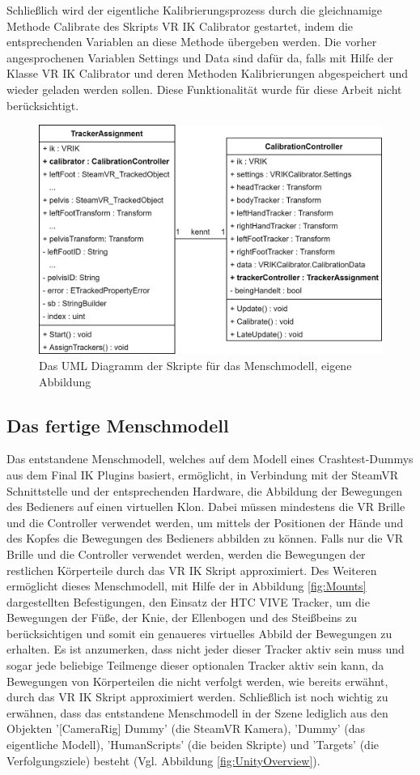 Schließlich wird der eigentliche Kalibrierungsprozess durch die gleichnamige Methode Calibrate des Skripts VR IK Calibrator gestartet, indem die entsprechenden Variablen an diese Methode übergeben werden. Die vorher angesprochenen Variablen Settings und Data sind dafür da, falls mit Hilfe der Klasse VR IK Calibrator und deren Methoden Kalibrierungen abgespeichert und wieder geladen werden sollen. Diese Funktionalität wurde für diese Arbeit nicht berücksichtigt.
\begin{figure}[h]
	\centering
	\includegraphics[width=0.6\linewidth]{Bilder/A40_MenschUML}
	\caption{Das UML Diagramm der Skripte für das Menschmodell, eigene Abbildung}
	\label{fig:MenschUML}
\end{figure}

\subsection{Das fertige Menschmodell}\label{sec:MMFunktionen}
Das entstandene Menschmodell, welches auf dem Modell eines Crashtest-Dummys aus dem Final IK Plugins basiert, ermöglicht, in Verbindung mit der SteamVR Schnittstelle und der entsprechenden Hardware, die Abbildung der Bewegungen des Bedieners auf einen virtuellen Klon. Dabei müssen mindestens die VR Brille und die Controller verwendet werden, um mittels der Positionen der Hände und des Kopfes die Bewegungen des Bedieners abbilden zu können. Falls nur die VR Brille und die Controller verwendet werden, werden die Bewegungen der restlichen Körperteile durch das VR IK Skript approximiert. Des Weiteren ermöglicht dieses Menschmodell, mit Hilfe der in Abbildung \ref{fig:Mounts} dargestellten Befestigungen, den Einsatz der HTC VIVE Tracker, um die Bewegungen der Füße, der Knie, der Ellenbogen und des Steißbeins zu berücksichtigen und somit ein genaueres virtuelles Abbild der Bewegungen zu erhalten. Es ist anzumerken, dass nicht jeder dieser Tracker aktiv sein muss und sogar jede beliebige Teilmenge dieser optionalen Tracker aktiv sein kann, da Bewegungen von Körperteilen die nicht verfolgt werden, wie bereits erwähnt, durch das VR IK Skript approximiert werden.
\newline
Schließlich ist noch wichtig zu erwähnen, dass das entstandene Menschmodell in der Szene lediglich aus den Objekten '[CameraRig] Dummy' (die SteamVR Kamera), 'Dummy' (das eigentliche Modell), 'HumanScripts' (die beiden Skripte) und 'Targets' (die Verfolgungsziele) besteht (Vgl. Abbildung \ref{fig:UnityOverview}).

